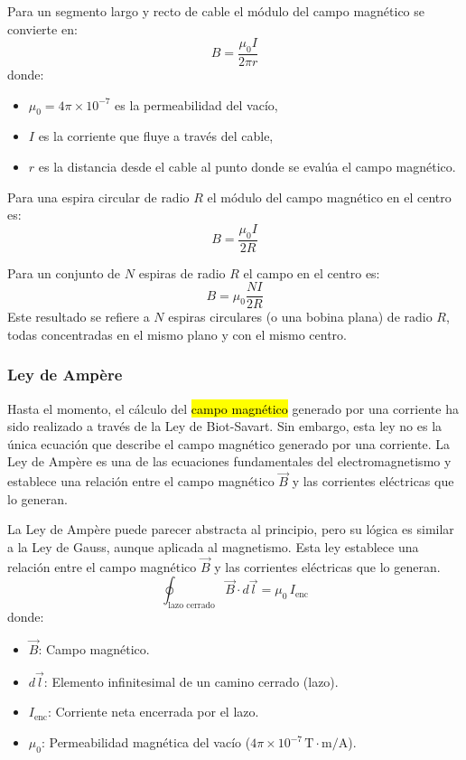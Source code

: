 Para un segmento largo y recto de cable el módulo del campo magnético se convierte en:
\begin{equation*}
  B = \frac{\mu_0 I}{2\pi r}
\end{equation*}
donde:
\begin{itemize}
  \item \(\mu_0 = 4 \pi \times 10^{-7}\) es la permeabilidad del vacío,
  \item \(I\) es la corriente que fluye a través del cable,
  \item \(r\) es la distancia desde el cable al punto donde se evalúa el campo magnético.
\end{itemize}

\noindent Para una espira circular de radio \(R\) el módulo del campo magnético en el centro es:
\begin{equation*}
  B = \frac{\mu_0 I}{2R}
\end{equation*}

\noindent Para un conjunto de \(N\) espiras de radio \(R\) el campo en el centro es:
\begin{equation*}
  B = \mu_0 \frac{N I}{2R}
\end{equation*}
Este resultado se refiere a \(N\) espiras circulares (o una bobina plana) de radio \(R\), todas concentradas en el mismo plano y con el mismo centro.

\subsubsection{Ley de Ampère}

Hasta el momento, el cálculo del \hl{campo magnético} generado por una corriente ha sido realizado a través de la Ley de Biot-Savart. Sin embargo, esta ley no es la única ecuación que describe el campo magnético generado por una corriente. La Ley de Ampère es una de las ecuaciones fundamentales del electromagnetismo y establece una relación entre el campo magnético \(\vec{B}\) y las corrientes eléctricas que lo generan. 

La Ley de Ampère puede parecer abstracta al principio, pero su lógica es similar a la Ley de Gauss, aunque aplicada al magnetismo. Esta ley establece una relación entre el campo magnético \(\vec{B}\) y las corrientes eléctricas que lo generan. 
\[
\oint_{\text{lazo cerrado}} \vec{B} \cdot d\vec{l} = \mu_0 \, I_{\text{enc}}
\]
donde:
\begin{itemize}
  \item \(\vec{B}\): Campo magnético.
  \item \(d\vec{l}\): Elemento infinitesimal de un camino cerrado (lazo).
  \item \(I_{\text{enc}}\): Corriente neta encerrada por el lazo.
  \item \(\mu_0\): Permeabilidad magnética del vacío (\(4\pi \times 10^{-7} \, \mathrm{T \cdot m/A}\)).
\end{itemize}

